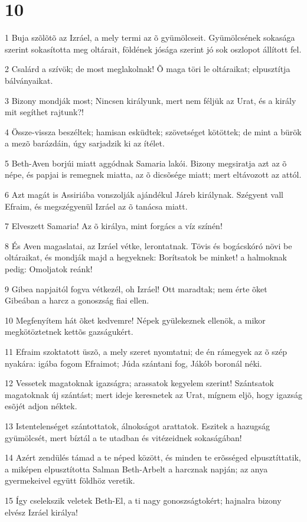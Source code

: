 \chapter{10}

\par 1 Buja szõlõtõ az Izráel, a mely termi az õ gyümölcseit. Gyümölcsének sokasága szerint sokasította meg oltárait, földének jósága szerint jó sok oszlopot  állított fel.
\par 2 Csalárd a szívök; de most meglakolnak! Õ maga töri le oltáraikat; elpusztítja bálványaikat.
\par 3 Bizony mondják most; Nincsen királyunk, mert nem féljük az Urat, és a király mit segíthet rajtunk?!
\par 4 Össze-vissza beszéltek; hamisan esküdtek; szövetséget kötöttek; de mint a bürök a mezõ barázdáin, úgy sarjadzik ki az ítélet.
\par 5 Beth-Aven borjúi miatt aggódnak Samaria lakói. Bizony megsiratja azt az õ népe, és papjai is remegnek miatta, az õ dicsõsége miatt; mert eltávozott az attól.
\par 6 Azt magát is Assiriába vonszolják ajándékul Járeb királynak. Szégyent vall Efraim, és megszégyenül Izráel az õ tanácsa miatt.
\par 7 Elveszett Samaria! Az õ királya, mint forgács a víz színén!
\par 8 És Aven magaslatai, az Izráel vétke, lerontatnak. Tövis és bogácskóró növi be oltáraikat,  és mondják majd a hegyeknek: Borítsatok be minket! a halmoknak pedig: Omoljatok reánk!
\par 9 Gibea napjaitól fogva vétkezél, oh Izráel! Ott maradtak; nem érte õket Gibeában a harcz a gonoszság fiai  ellen.
\par 10 Megfenyítem hát õket kedvemre! Népek gyülekeznek ellenök, a mikor megkötöztetnek kettõs gazságukért.
\par 11 Efraim szoktatott üszõ, a mely szeret nyomtatni; de én rámegyek az õ szép nyakára: igába fogom Efraimot; Júda szántani fog, Jákób boronál néki.
\par 12 Vessetek magatoknak igazságra; arassatok kegyelem szerint! Szántsatok magatoknak új szántást; mert ideje keresnetek az Urat, mígnem eljõ, hogy igazság esõjét adjon néktek.
\par 13 Istentelenséget szántottatok, álnokságot arattatok. Eszitek a hazugság gyümölcsét, mert bíztál a te utadban és vitézeidnek sokaságában!
\par 14 Azért zendülés támad a te néped között, és minden te erõsséged elpusztíttatik, a miképen elpusztította Salman Beth-Arbelt a harcznak napján; az anya gyermekeivel együtt földhöz veretik.
\par 15 Így cselekszik veletek Beth-El, a ti nagy gonoszságtokért; hajnalra bizony elvész Izráel királya!

